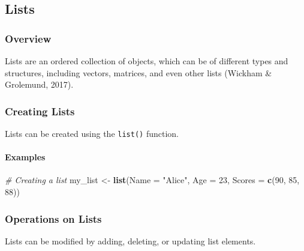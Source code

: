 \documentclass[
]{book}
\newenvironment{Shaded}{\begin{snugshade}}{\end{snugshade}}
\newcommand{\AttributeTok}[1]{\textcolor[rgb]{0.13,0.29,0.53}{#1}}
\newcommand{\CommentTok}[1]{\textcolor[rgb]{0.56,0.35,0.01}{\textit{#1}}}
\newcommand{\DecValTok}[1]{\textcolor[rgb]{0.00,0.00,0.81}{#1}}
\newcommand{\FunctionTok}[1]{\textcolor[rgb]{0.13,0.29,0.53}{\textbf{#1}}}
\newcommand{\NormalTok}[1]{#1}
\newcommand{\OtherTok}[1]{\textcolor[rgb]{0.56,0.35,0.01}{#1}}
\newcommand{\StringTok}[1]{\textcolor[rgb]{0.31,0.60,0.02}{#1}}
\begin{document}
\hypertarget{lists}{%
\subsection*{Lists}\label{lists}}

\hypertarget{overview-5}{%
\subsubsection*{Overview}\label{overview-5}}

Lists are an ordered collection of objects, which can be of different types and structures, including vectors, matrices, and even other lists (Wickham \& Grolemund, 2017).

\hypertarget{creating-lists}{%
\subsubsection*{Creating Lists}\label{creating-lists}}

Lists can be created using the \texttt{list()} function.

\hypertarget{examples-5}{%
\paragraph*{Examples}\label{examples-5}}

\begin{Shaded}
\begin{Highlighting}[]
\CommentTok{\# Creating a list}
\NormalTok{my\_list }\OtherTok{\textless{}{-}} \FunctionTok{list}\NormalTok{(}\AttributeTok{Name =} \StringTok{"Alice"}\NormalTok{, }\AttributeTok{Age =} \DecValTok{23}\NormalTok{, }\AttributeTok{Scores =} \FunctionTok{c}\NormalTok{(}\DecValTok{90}\NormalTok{, }\DecValTok{85}\NormalTok{, }\DecValTok{88}\NormalTok{))}
\end{Highlighting}
\end{Shaded}

\hypertarget{operations-on-lists}{%
\subsubsection*{Operations on Lists}\label{operations-on-lists}}

Lists can be modified by adding, deleting, or updating list elements.
\end{document}
